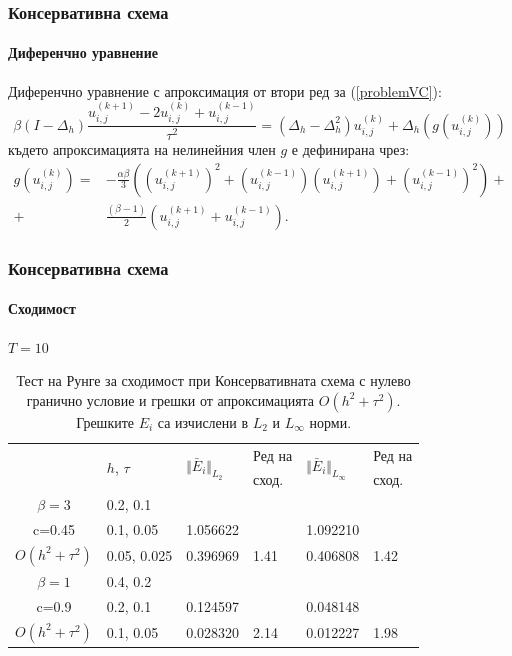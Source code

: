 \documentclass{beamer}
\newcommand{\rf}[1]{(\ref{#1})}
\begin{document}

\begin{frame}
\frametitle{Консервативна схема}
\framesubtitle{Диференчно уравнение}
Диференчно уравнение с апроксимация от втори ред за \rf{problemVC}:
\begin{equation}\label{problemVCDiscrete}
\beta (I-\Delta_h)\frac{ u^{(k+1)}_{i, j} - 2u^{(k)}_{i,j} + u^{(k-1)}_{i,j} }{\tau^2} = (\Delta_h - \Delta_h^2)u^{(k)}_{i,j} + \Delta_h(g(u^{(k)}_{i,j}))
\end{equation}
%
където апроксимацията на нелинейния член $g$ е дефинирана чрез:
\begin{align}
g(u^{(k)}_{i,j})=& -\frac{\alpha \beta} { 3 } \left( (u^{(k+1)}_{i,j})^2 + (u^{(k-1)}_{i,j})(u^{(k+1)}_{i,j}) + (u^{(k-1)}_{i,j})^2 \right) + \nonumber\\
+&\frac{ (\beta - 1 )}{ 2 }\left( u^{(k+1)}_{i,j} + u^{(k-1)}_{i,j} \right).
\end{align}


\end{frame}



\begin{frame}
\frametitle{Консервативна схема}
\framesubtitle{Сходимост}
$T = 10$
\begin{table}[ht]
\centering
\small
		\begin{tabular}{||c|l|ll|ll||}
			\hline
			\hline
      \multirow{2  }{*}{ }        & \multirow{2  }{*}{$h$, $\tau$}  &	\multirow{2  }{*}{  $\Vert \bar E_i \Vert_{L_2} $ } 	&Ред на & \multirow{2  }{*}{  $\Vert \bar E_i \Vert_{L_\infty}$ }	&Ред на   \\
	                                        &                                                &    										&  сход. & 										& сход. \\
   			\hline 
					\hline 
  $\beta=3$                 &0.2, 0.1          &                 &                &                  &                   \\
   c=0.45                     &0.1, 0.05       & 1.056622   &                & 1.092210 &                   \\
     $O(h^2 + \tau^ 2)$ &0.05, 0.025  & 0.396969    	& 1.41       	& 0.406808   &   1.42   \\
	   \hline
			\hline 
       $\beta=1$           & 0.4, 0.2       &                   &           &                 &   \\
                  c=0.9       & 0.2, 0.1        & 0.124597   &          &0.048148  &   \\
  $O(h^2+ \tau^2)$  & 0.1, 0.05       & 0.028320   & 2.14  &0.012227  & 1.98 \\
	   \hline
			\hline 
		\end{tabular}
		\caption{Тест на Рунге за сходимост при Консервативната схема с нулево гранично условие и грешки от апроксимацията $O(h^{2} + \tau^2 )$. Грешките $E_i$ са изчислени в $L_2$ и $L_\infty$ норми.}
\label{tableC}
\end{table}

\end{frame}
\end{document}
